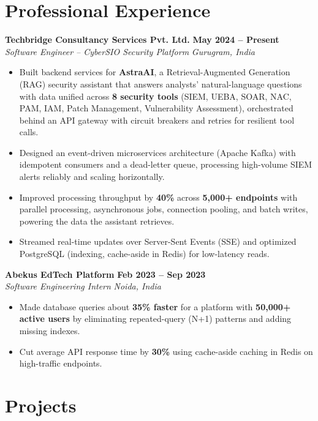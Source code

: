\documentclass[10pt,letterpaper]{article}
\newcommand{\resumeSubheading}[4]{
    \textbf{#1} \hfill \textbf{#2}\\
    \textit{#3} \hfill \textit{#4}

}
\newcommand{\resumeItem}[1]{
    \item #1
}
\begin{document}
\section{Professional Experience}

\resumeSubheading
    {Techbridge Consultancy Services Pvt. Ltd.}
    {May 2024 -- Present}
    {Software Engineer -- CyberSIO Security Platform}
    {Gurugram, India}

\begin{itemize}
    \resumeItem{Built backend services for \textbf{AstraAI}, a Retrieval-Augmented Generation (RAG) security assistant that answers analysts' natural-language questions with data unified across \textbf{8 security tools} (SIEM, UEBA, SOAR, NAC, PAM, IAM, Patch Management, Vulnerability Assessment), orchestrated behind an API gateway with circuit breakers and retries for resilient tool calls.}

    \resumeItem{Designed an event-driven microservices architecture (Apache Kafka) with idempotent consumers and a dead-letter queue, processing high-volume SIEM alerts reliably and scaling horizontally.}

    \resumeItem{Improved processing throughput by \textbf{40\%} across \textbf{5,000+ endpoints} with parallel processing, asynchronous jobs, connection pooling, and batch writes, powering the data the assistant retrieves.}

    \resumeItem{Streamed real-time updates over Server-Sent Events (SSE) and optimized PostgreSQL (indexing, cache-aside in Redis) for low-latency reads.}
\end{itemize}

\vspace{1pt}

\resumeSubheading
    {Abekus EdTech Platform}
    {Feb 2023 -- Sep 2023}
    {Software Engineering Intern}
    {Noida, India}

\begin{itemize}
    \resumeItem{Made database queries about \textbf{35\% faster} for a platform with \textbf{50,000+ active users} by eliminating repeated-query (N+1) patterns and adding missing indexes.}

    \resumeItem{Cut average API response time by \textbf{30\%} using cache-aside caching in Redis on high-traffic endpoints.}
\end{itemize}

\section{Projects}
\end{document}
